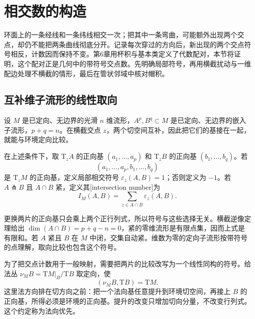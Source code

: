 
% 
% 

\section{相交数的构造}
\label{g2:sec:1602}

环面上的一条经线和一条纬线相交一次；把其中一条弯曲，可能额外出现两个交点，却仍不能把两条曲线彻底分开。记录每次穿过的方向后，新出现的两个交点符号相反，计数因而保持不变。第6章用杯积与基本类定义了代数配对，本节将证明，这个配对正是几何中的带符号交点数。先明确局部符号，再用横截扰动与一维配边处理不横截的情形，最后在管状邻域中核对帽积。

\subsection{互补维子流形的线性取向}
\label{g2:subsec:1602:01}

设 \(M\) 是已定向、无边界的光滑 \(n\) 维流形，\(A^p,B^q\subset M\) 是已定向、无边界的嵌入子流形，\(p+q=n\)。在横截交点 \(z\)，两个切空间互补，因此把它们的基接在一起，就能与环境定向比较。

\begin{definition}\label{g2:def:local-intersection-sign}
	在上述条件下，取 \(\mathrm{T}_zA\) 的正向基 \((a_1,\ldots,a_p)\) 和 \(\mathrm{T}_zB\) 的正向基 \((b_1,\ldots,b_q)\)。若
	\[
		(a_1,\ldots,a_p,b_1,\ldots,b_q)
	\]
	是 \(\mathrm{T}_zM\) 的正向基，定义局部相交符号 \(\varepsilon_z(A,B)=1\)；否则定义为 \(-1\)。若 \(A\pitchfork B\) 且 \(A\cap B\) 紧，定义其[intersection number]为
	\[
		I_M(A,B)=\sum_{z\in A\cap B}\varepsilon_z(A,B).
	\]
\end{definition}

更换两片的正向基只会乘上两个正行列式，所以符号与这些选择无关。横截逆像定理给出 \(\dim(A\cap B)=p+q-n=0\)，紧的零维流形是有限点集，因而上式是有限和。若 \(A\) 紧且 \(B\) 在 \(M\) 中闭，交集自动紧。维数为零的定向子流形按带符号的点理解，取向比较也包含这个符号。

\ProseParagraphBreak

为了把交点计数用于一般映射，需要把两片的比较改写为一个线性同构的符号。给法丛 \(\nu_MB=\mathrm{T}M|_B/\mathrm{T}B\) 取定向，使
\begin{equation}\label{g2:eq:normal-first-orientation}
	(\nu_MB,\mathrm{T}B)=\mathrm{T}M.
\end{equation}
这里法方向排在切方向之前：把一个法向基任意提升到环境切空间，再接上 \(B\) 的正向基，所得必须是环境的正向基。提升的改变只增加切向分量，不改变行列式。这个约定称为法向优先。

